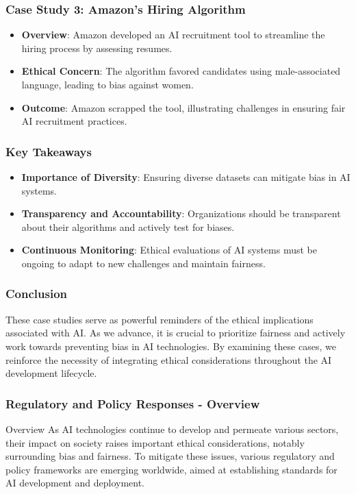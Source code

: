 \documentclass{beamer}
\begin{document}
\begin{frame}[fragile]
    \frametitle{Case Study 3: Amazon's Hiring Algorithm}
    \begin{itemize}
        \item \textbf{Overview}: Amazon developed an AI recruitment tool to streamline the hiring process by assessing resumes.
        \item \textbf{Ethical Concern}: The algorithm favored candidates using male-associated language, leading to bias against women.
        \item \textbf{Outcome}: Amazon scrapped the tool, illustrating challenges in ensuring fair AI recruitment practices.
    \end{itemize}
\end{frame}

\begin{frame}[fragile]
    \frametitle{Key Takeaways}
    \begin{itemize}
        \item \textbf{Importance of Diversity}: Ensuring diverse datasets can mitigate bias in AI systems.
        \item \textbf{Transparency and Accountability}: Organizations should be transparent about their algorithms and actively test for biases.
        \item \textbf{Continuous Monitoring}: Ethical evaluations of AI systems must be ongoing to adapt to new challenges and maintain fairness.
    \end{itemize}
\end{frame}

\begin{frame}[fragile]
    \frametitle{Conclusion}
    These case studies serve as powerful reminders of the ethical implications associated with AI. 
    As we advance, it is crucial to prioritize fairness and actively work towards preventing bias in AI technologies. 
    By examining these cases, we reinforce the necessity of integrating ethical considerations throughout the AI development lifecycle.
\end{frame}

\begin{frame}[fragile]
    \frametitle{Regulatory and Policy Responses - Overview}
    \begin{block}{Overview}
        As AI technologies continue to develop and permeate various sectors, their impact on society raises important ethical considerations, notably surrounding bias and fairness. To mitigate these issues, various regulatory and policy frameworks are emerging worldwide, aimed at establishing standards for AI development and deployment.
    \end{block}
\end{frame}
\end{document}

